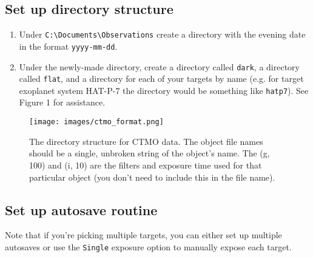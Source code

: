 \documentclass{article}
\begin{document}
	\subsection{Set up directory structure}
	
	\begin{enumerate}
		
		\item Under \texttt{C:\textbackslash Documents\textbackslash Observations} create a directory with the evening date in the format \texttt{yyyy-mm-dd}.
		
		\item Under the newly-made directory, create a directory called \texttt{dark}, a directory called \texttt{flat}, and a directory for each of your targets by name (e.g. for target exoplanet system HAT-P-7 the directory would be something like \texttt{hatp7}). See Figure 1 for assistance.
		
	\end{enumerate}
	
	\begin{figure}[h]
		\centering
		\texttt{[image: images/ctmo\_format.png]}
		\caption{The directory structure for CTMO data. The object file names should be a single, unbroken string of the object's name. The (g, 100) and (i, 10) are the filters and exposure time used for that particular object (you don't need to include this in the file name).}
	\end{figure}
	
	\subsection{Set up autosave routine}
	
	Note that if you're picking multiple targets, you can either set up multiple autosaves or use the \texttt{Single} exposure option to manually expose each target.
	
\end{document}
